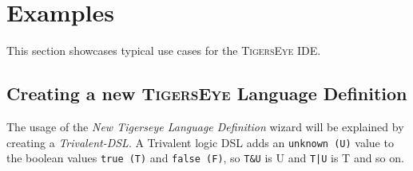 \documentclass[article,colorback,accentcolor=tud4c]{tudreport}
\newcommand\tiger{%
  \textsc{TigersEye}
}
\begin{document}
  \section{Examples}\label{sec:examples}
	This section showcases typical use cases for the \tiger IDE. 
	
	\subsection{Creating a new \tiger Language Definition}
	
	The usage of the \emph{New Tigerseye Language Definition} wizard will be explained by creating a \emph{Trivalent-DSL}. A
	Trivalent logic DSL adds an \texttt{unknown (U)} value to the boolean values \texttt{true (T)} and \texttt{false (F)}, so \texttt{T\&U} is U and \texttt{T|U} is T and so on.
	
\end{document}
